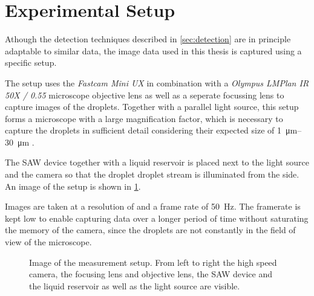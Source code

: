 \section{Experimental Setup}
\label{sec:setup}

Athough the detection techniques described in \ref{sec:detection} are in principle adaptable to similar data, the image data used in this thesis is captured using a specific setup. 

The setup uses the \emph{Fastcam Mini UX} in combination with a \emph{Olympus LMPlan IR 50X / 0.55} microscope objective lens as well as a seperate focussing lens to capture images of the droplets.
Together with a parallel light source, this setup forms a microscope with a large magnification factor, which is necessary to capture the droplets in sufficient detail considering their expected size of \SIrange{1}{30}{\micro\meter} \cite{kapplAkustischInduzierteVernebelung2022}.

The SAW device together with a liquid reservoir is placed next to the light source and the camera so that the droplet droplet stream is illuminated from the side. An image of the setup is shown in \ref{fig:setup}.

Images are taken at a resolution of  and a frame rate of \SI{50}{\hertz}. The framerate is kept low to enable capturing data over a longer period of time without saturating the memory of the camera, since the droplets are not constantly in the field of view of the microscope. 

\begin{figure}[htbp]
    \centering
    \vspace{0.2cm}
    \caption{Image of the measurement setup. From left to right the high speed camera, the focusing lens and objective lens, the SAW device and the liquid reservoir as well as the light source are visible.}
    \label{fig:setup}
\end{figure}